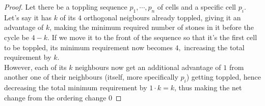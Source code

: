 \documentclass{article}
\begin{document}
    \begin{proof}
        Let there be a toppling sequence $ p_1, \cdots, p_n $ of cells and a specific cell $ p_i $. Let's say it has $ k $ of its $ 4 $ orthogonal neigbours already toppled, giving it an advantage of $ k $, making the minimum required number of stones in it before the cycle be $ 4 - k. $ If we move it to the front of the sequence so that it's the first cell to be toppled, its minimum requirement now becomes $ 4, $ increasing the total requirement by $ k. $\\ 
       However, each of its $ k $ neighbours now get an additional advantage of $ 1 $ from another one of their neighbours (itself, more specifically $ p_i $) getting toppled, hence decreasing the total minimum requirement by $ 1 \cdot k = k $, thus making the net change from the ordering change $ 0 $
    \end{proof}
\end{document}
